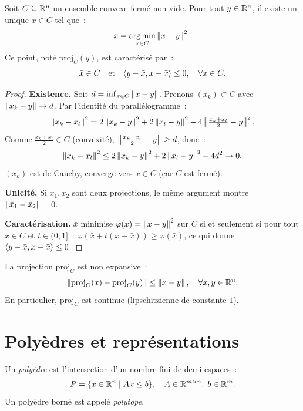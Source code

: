\begin{theoreme}
\label{thm:projection}
Soit $C \subseteq \mathbb{R}^n$ un ensemble convexe ferm\'e non vide. Pour tout $y \in \mathbb{R}^n$,
il existe un unique $\bar{x} \in C$ tel que~:
\[
    \bar{x} = \operatorname*{arg\,min}_{x \in C} \left\| x - y \right\|^2.
\]
Ce point, not\'e $\mathrm{proj}_C(y)$, est caract\'eris\'e par~:
\[
    \bar{x} \in C \quad \text{et} \quad
    \langle y - \bar{x}, x - \bar{x} \rangle \leq 0, \quad \forall x \in C.
\]
\end{theoreme}

\begin{proof}
\textbf{Existence.} Soit $d = \inf_{x \in C} \left\| x - y \right\|$. Prenons $(x_k) \subset C$
avec $\left\| x_k - y \right\| \to d$. Par l'identit\'e du parall\'elogramme~:
\[
    \left\| x_k - x_l \right\|^2 = 2\left\| x_k - y \right\|^2 + 2\left\| x_l - y \right\|^2 - 4\left\| \tfrac{x_k+x_l}{2} - y \right\|^2.
\]
Comme $\frac{x_k+x_l}{2} \in C$ (convexit\'e), $\left\| \frac{x_k+x_l}{2} - y \right\| \geq d$, donc~:
\[
    \left\| x_k - x_l \right\|^2 \leq 2\left\| x_k - y \right\|^2 + 2\left\| x_l - y \right\|^2 - 4d^2 \to 0.
\]
$(x_k)$ est de Cauchy, converge vers $\bar{x} \in C$ (car $C$ est ferm\'e).

\textbf{Unicit\'e.} Si $\bar{x}_1, \bar{x}_2$ sont deux projections, le m\^eme argument
montre $\left\| \bar{x}_1 - \bar{x}_2 \right\| = 0$.

\textbf{Caract\'erisation.} $\bar{x}$ minimise $\varphi(x) = \left\| x-y \right\|^2$ sur $C$
si et seulement si pour tout $x \in C$ et $t \in (0,1]$~:
$\varphi(\bar{x} + t(x-\bar{x})) \geq \varphi(\bar{x})$, ce qui donne
$\langle y - \bar{x}, x - \bar{x} \rangle \leq 0$.
\end{proof}

\begin{proposition}
La projection $\mathrm{proj}_C$ est non expansive~:
\[
    \left\| \mathrm{proj}_C(x) - \mathrm{proj}_C(y) \right\| \leq \left\| x - y \right\|, \quad \forall x, y \in \mathbb{R}^n.
\]
En particulier, $\mathrm{proj}_C$ est continue (lipschitzienne de constante $1$).
\end{proposition}

\section{Poly\`edres et repr\'esentations}

\begin{definition}
Un \emph{poly\`edre} est l'intersection d'un nombre fini de demi-espaces~:
\[
    P = \{x \in \mathbb{R}^n \mid Ax \leq b\}, \quad A \in \mathbb{R}^{m \times n}, \; b \in \mathbb{R}^m.
\]
Un poly\`edre born\'e est appel\'e \emph{polytope}.
\end{definition}

